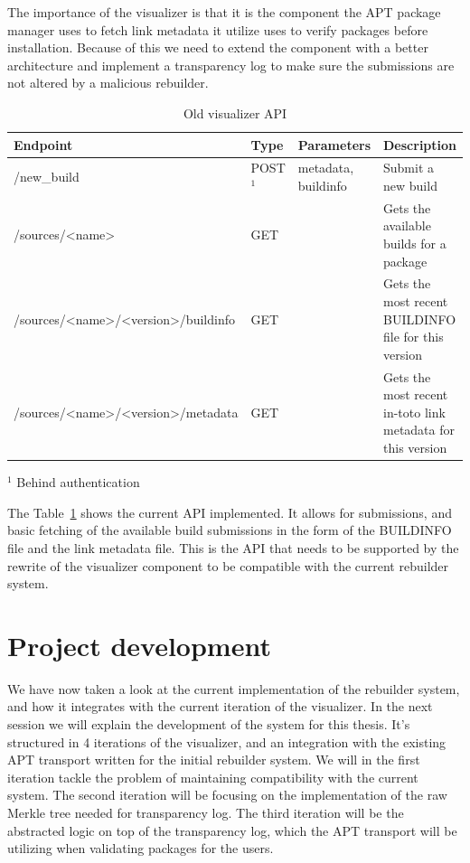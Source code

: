 \documentclass[../Main/thesis.tex]{subfiles}
\begin{document}
The importance of the visualizer is that it is the component the APT package
manager uses to fetch link metadata it utilize uses to verify packages before
installation. Because of this we need to extend the component with a better
architecture and implement a transparency log to make sure the submissions are
not altered by a malicious rebuilder.


\begin{table}[H]
\footnotesize
\centering
\settowidth{}
\setlength\extrarowheight{2pt}
\begin{tabulary}{\textwidth}{|l|L|l|L|}
\hline
    \textbf{Endpoint} & 
    \textbf{Type} & 
    \textbf{Parameters} & 
    \textbf{Description} \\
\hline
    /new\_build & POST$^1$ & metadata, buildinfo & Submit a new build \\  \hline
    /sources/<name> & GET & & Gets the available builds for a package \\  \hline
    /sources/<name>/<version>/buildinfo& GET & & Gets the most recent BUILDINFO file for this version\\  \hline
    /sources/<name>/<version>/metadata & GET & & Gets the most recent in-toto link metadata for this version \\  \hline
\end{tabulary}
\footnotesize{$^1$ Behind authentication}\\
\caption{Old visualizer API}
\label{api:old_visualizer}
\end{table}

The Table~\ref{api:old_visualizer} shows the current API implemented. It allows
for submissions, and basic fetching of the available build submissions in the
form of the BUILDINFO file and the link metadata file. This is the API that
needs to be supported by the rewrite of the visualizer component to be
compatible with the current rebuilder system.

\section{Project development}%
\label{sec:project_development}
We have now taken a look at the current implementation of the rebuilder system,
and how it integrates with the current iteration of the visualizer. In the next
session we will explain the development of the system for this thesis. It's
structured in 4 iterations of the visualizer, and an integration with the
existing APT transport written for the initial rebuilder system. We will in the
first iteration tackle the problem of maintaining compatibility with the current
system. The second iteration will be focusing on the implementation of the raw
Merkle tree needed for transparency log. The third iteration will be the
abstracted logic on top of the transparency log, which the APT transport will be
utilizing when validating packages for the users.
\end{document}
